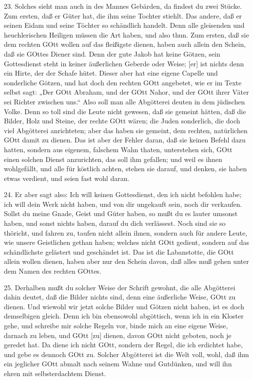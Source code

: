 23. Solches sieht man auch in des Mannes Gebärden, da findest du zwei Stücke. Zum ersten, daß er Güter hat, die ihm seine Tochter stiehlt. Das andere, daß er seinen Eidam und seine Töchter so schändlich handelt. Denn alle gleisenden und heuchlerischen Heiligen müssen die Art haben, und also thun. Zum ersten, daß sie dem rechten GOtt wollen auf das fleißigste dienen, haben auch allein den Schein, daß sie GOttes Diener sind. Denn der gute Jakob hat keine Götzen, sein Gottesdienst steht in keiner äußerlichen Geberde oder Weise; [er] ist nichts denn ein Hirte, der der Schafe hütet. Dieser aber hat eine eigene Capelle und sonderliche Götzen, und hat doch den rechten GOtt angebetet, wie er im Texte selbst sagt: „Der GOtt Abraham, und der GOtt Nahor, und der GOtt
ihrer Väter sei Richter zwischen uns.“ Also soll man alle Abgötterei deuten in dem jüdischen Volke. Denn so toll sind die Leute nicht gewesen, daß sie gemeint hätten, daß die Bilder, Holz und Steine, der rechte GOtt wären; die Juden sonderlich, die doch viel Abgötterei anrichteten; aber das haben sie gemeint, dem rechten, natürlichen GOtt damit zu dienen. Das ist aber der Fehler daran, daß sie keinen Befehl dazu hatten, sondern aus eigenem, falschem Wahn thaten, unterstehen sich, GOtt einen solchen Dienst anzurichten, das soll ihm gefallen; und weil es ihnen wohlgefällt, und alle für köstlich achten, stehen sie darauf, und denken, sie haben etwas verdient, und seien fast wohl daran.

24. Er aber sagt also: Ich will keinen Gottesdienst, den ich nicht befohlen habe; ich will dein Werk nicht haben, und von dir ungekauft sein, noch dir verkaufen. Sollst du meine Gnade, Geist und Güter haben, so mußt du es lauter umsonst haben, und sonst nichts haben, darauf du dich verlässest. Noch sind sie so thöricht, und fahren zu, taufen nicht allein ihnen, sondern auch für andere Leute, wie unsere Geistlichen gethan haben; welches nicht GOtt gedient, sondern auf das schändlichste gelästert und geschändet ist. Das ist die Labanstotte, die GOtt allein wollen dienen, haben aber nur den Schein davon, daß alles muß gehen unter dem Namen des rechten GOttes.

25. Derhalben mußt du solcher Weise der Schrift gewohnt, die alle Abgötterei dahin deutet, daß die Bilder nichts sind, denn eine äußerliche Weise, GOtt zu dienen. Und wiewohl wir jetzt solche Bilder und Götzen nicht haben, ist es doch demselbigen gleich. Denn ich bin ebensowohl abgöttisch, wenn ich in ein Kloster gehe, und schreibe mir solche Regeln vor, binde mich an eine eigene Weise, darnach zu leben, und GOtt [zu] dienen, davon GOtt nicht geboten, noch je geredet hat. Da diene ich nicht GOtt, sondern der Regel, die ich erdichtet habe, und gebe es dennoch GOtt zu. Solcher Abgötterei ist die Welt voll, wohl, daß ihm ein jeglicher GOtt abmalt nach seinem Wahne und Gutdünken, und will ihn ehren mit selbsterdachtem Dienst.

